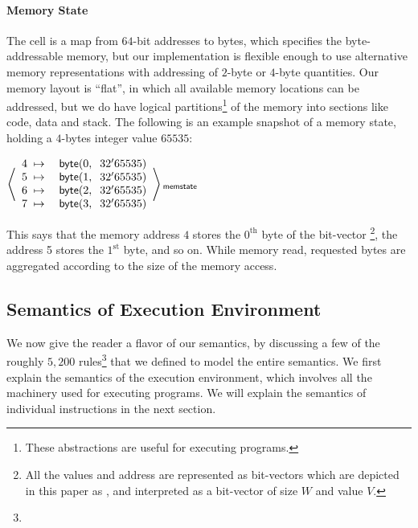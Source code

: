 \paragraph{Memory State}
The  cell is a map from $64$-bit addresses to bytes, which specifies the byte-addressable memory, but our implementation is flexible enough to use alternative memory  representations with addressing of $2$-byte or $4$-byte quantities.  Our memory layout is ``flat'', in which all available memory locations can be addressed,  but we do have logical partitions\footnote{These abstractions are useful for executing \ISA programs.} of the memory into sections like code, data and stack.  The following is an example snapshot of a memory state,  holding a $4$-bytes integer value $65535$:
\begin{center}
    \newcommand{\bytecell}[2]{\s{byte}({#1},\;\;{#2})}
    $
    \kall{memstate} {
        \begin{array}{ll}
        4 \;\mapsto\; & \bytecell{0}{32'65535}\\
        5 \;\mapsto\; & \bytecell{1}{32'65535}\\
        6 \;\mapsto\; & \bytecell{2}{32'65535}\\
        7 \;\mapsto\; & \bytecell{3}{32'65535}\\
        \end{array}
    }
    $
\end{center}
This says that the memory address $4$ stores the $0^\text{th}$ byte of the bit-vector \footnote{All the values and address are represented as bit-vectors which are depicted in this paper  as , and interpreted as a bit-vector of size $W$ and value $V$.}, the address 5 stores the $1^\text{st}$ byte, and so on. While memory read, requested bytes are aggregated according to the size of the memory access.



\subsection{Semantics of Execution Environment}
%

We now give the reader a flavor of our semantics, by discussing a few of the roughly $5,200$ rules\footnote{} that we defined to model the entire semantics.
We first explain the semantics of the execution environment, which involves all the machinery used for executing \ISA programs.
We will explain the semantics of individual instructions in the next section.

